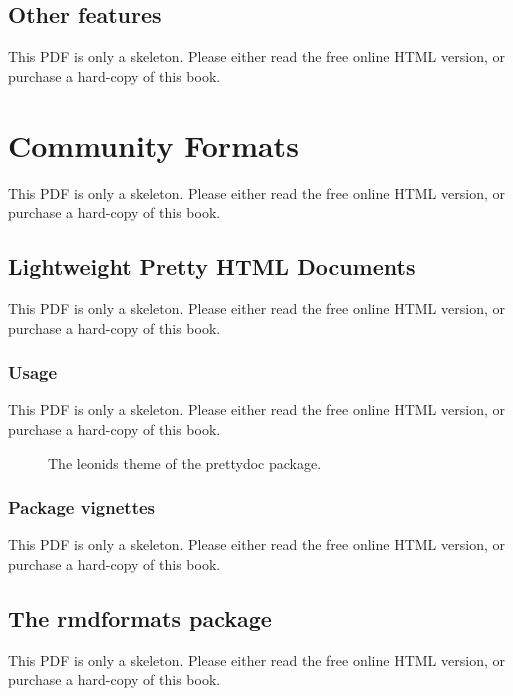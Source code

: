 \documentclass[
  11pt,
]{krantz}
\theoremstyle{definition}
\theoremstyle{definition}
\theoremstyle{definition}
\theoremstyle{definition}
\theoremstyle{remark}
\begin{document}
\section{Other features}\label{other-features-9}

This PDF is only a skeleton. Please either read the free online HTML version, or purchase a hard-copy of this book.

\chapter{Community Formats}\label{community}

This PDF is only a skeleton. Please either read the free online HTML version, or purchase a hard-copy of this book.

\section{Lightweight Pretty HTML Documents}\label{prettydoc}

This PDF is only a skeleton. Please either read the free online HTML version, or purchase a hard-copy of this book.

\subsection{Usage}\label{prettydoc-usage}

This PDF is only a skeleton. Please either read the free online HTML version, or purchase a hard-copy of this book.

\begin{figure}\caption{The leonids theme of the prettydoc package.}\end{figure}

\subsection{Package vignettes}\label{prettydoc-vignettes}

This PDF is only a skeleton. Please either read the free online HTML version, or purchase a hard-copy of this book.

\section{The rmdformats package}\label{rmdformats}

This PDF is only a skeleton. Please either read the free online HTML version, or purchase a hard-copy of this book.
\end{document}
